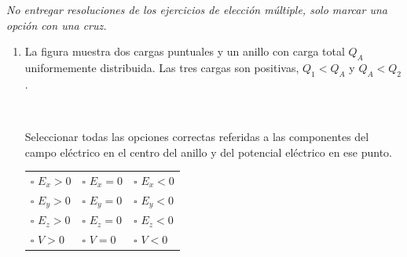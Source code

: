\documentclass[a4paper,11pt,dvipsnames]{article}
\begin{document}


\textit{No entregar resoluciones de los ejercicios de elección múltiple, solo marcar una opción con una cruz.}

\begin{enumerate}[leftmargin=*]
\item
\begin{minipage}[t]{.4\textwidth}
La figura muestra dos cargas puntuales y un anillo con carga total $Q_A$ uniformemente distribuida. Las tres cargas son positivas, $Q_1<Q_A$ y $Q_A<Q_2$.
\begin{center}
\end{center}
\end{minipage}
\begin{minipage}[t]{.05\textwidth}
~    
\end{minipage}
\begin{minipage}[t]{.5\textwidth}
Seleccionar todas las opciones correctas referidas a las componentes del campo eléctrico en el centro del anillo y del potencial eléctrico en ese punto.\\
\begin{tabularx}{\textwidth}{XXX}
$\square$ $E_x > 0$ & $\square$ $E_x = 0$ & $\square$ $E_x < 0$ \\
$\square$ $E_y > 0$ & $\square$ $E_y = 0$ & $\square$ $E_y < 0$\\
$\square$ $E_z > 0$ & $\square$ $E_z = 0$ & $\square$ $E_z < 0$\\
$\square$ $V > 0$ & $\square$ $V = 0$ & $\square$ $V < 0$
\end{tabularx}
\end{minipage}



\end{enumerate}
\end{document}

